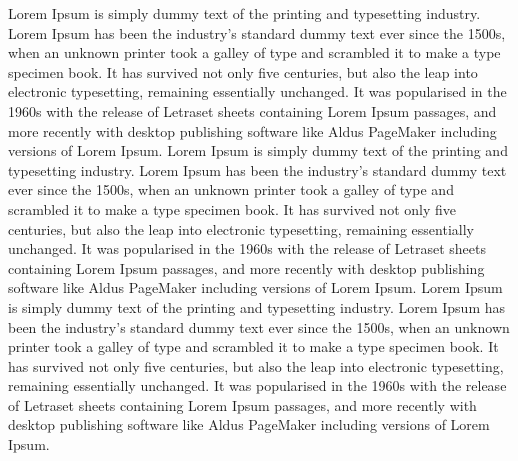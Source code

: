 Lorem Ipsum is simply dummy text of the printing and typesetting industry.
Lorem Ipsum has been the industry's standard dummy text ever since the 1500s,
when an unknown printer took a galley of type and scrambled it to make a type
specimen book. It has survived not only five centuries, but also the leap into
electronic typesetting, remaining essentially unchanged. It was popularised in
the 1960s with the release of Letraset sheets containing Lorem Ipsum passages,
and more recently with desktop publishing software like Aldus PageMaker
including versions of Lorem Ipsum. Lorem Ipsum is simply dummy text of the
printing and typesetting industry.  Lorem Ipsum has been the industry's
standard dummy text ever since the 1500s, when an unknown printer took a galley
of type and scrambled it to make a type specimen book. It has survived not only
five centuries, but also the leap into electronic typesetting, remaining
essentially unchanged. It was popularised in the 1960s with the release of
Letraset sheets containing Lorem Ipsum passages, and more recently with desktop
publishing software like Aldus PageMaker including versions of Lorem Ipsum.
Lorem Ipsum is simply dummy text of the printing and typesetting industry.
Lorem Ipsum has been the industry's standard dummy text ever since the 1500s,
when an unknown printer took a galley of type and scrambled it to make a type
specimen book. It has survived not only five centuries, but also the leap into
electronic typesetting, remaining essentially unchanged. It was popularised in
the 1960s with the release of Letraset sheets containing Lorem Ipsum passages,
and more recently with desktop publishing software like Aldus PageMaker
including versions of Lorem Ipsum.

\begin{figure}
  \subfloat{    \label{fig:a}} \vspace{-2cm}\\
  \subfloat{\hspace{-0.3cm} \label{fig:b}}
  \caption{\small }
  \vspace{-0.75cm}
  \label{fig:AB}
\end{figure}

